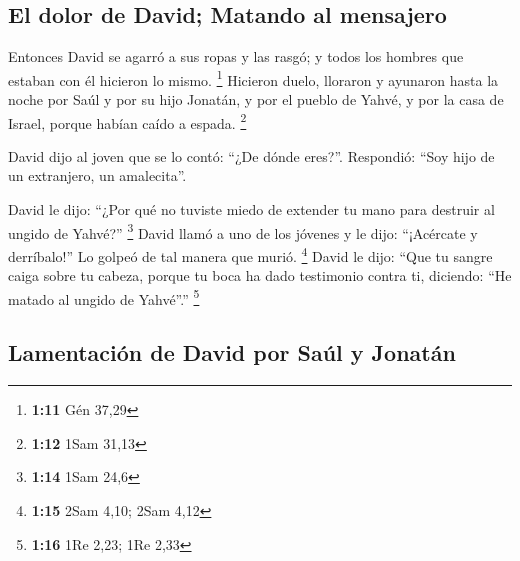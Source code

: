 \hypertarget{el-dolor-de-david-matando-al-mensajero}{%
\subsection{El dolor de David; Matando al
mensajero}\label{el-dolor-de-david-matando-al-mensajero}}

 Entonces David se agarró a sus ropas y las rasgó; y
todos los hombres que estaban con él hicieron lo mismo. \footnote{\textbf{1:11}
  Gén 37,29}  Hicieron duelo, lloraron y ayunaron hasta
la noche por Saúl y por su hijo Jonatán, y por el pueblo de Yahvé, y por
la casa de Israel, porque habían caído a espada. \footnote{\textbf{1:12}
  1Sam 31,13}

 David dijo al joven que se lo contó: ``¿De dónde
eres?''. Respondió: ``Soy hijo de un extranjero, un amalecita''.

 David le dijo: ``¿Por qué no tuviste miedo de extender
tu mano para destruir al ungido de Yahvé?'' \footnote{\textbf{1:14} 1Sam
  24,6}  David llamó a uno de los jóvenes y le dijo:
``¡Acércate y derríbalo!'' Lo golpeó de tal manera que murió.
\footnote{\textbf{1:15} 2Sam 4,10; 2Sam 4,12}  David le
dijo: ``Que tu sangre caiga sobre tu cabeza, porque tu boca ha dado
testimonio contra ti, diciendo: ``He matado al ungido de Yahvé''.''
\footnote{\textbf{1:16} 1Re 2,23; 1Re 2,33}

\hypertarget{lamentaciuxf3n-de-david-por-sauxfal-y-jonatuxe1n}{%
\subsection{Lamentación de David por Saúl y
Jonatán}\label{lamentaciuxf3n-de-david-por-sauxfal-y-jonatuxe1n}}

